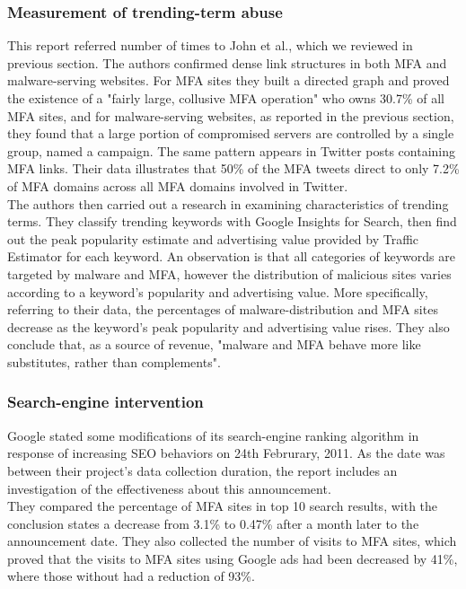 \subsubsection*{Measurement of trending-term abuse}
This report referred number of times to John et al.\cite{deseo}, which we 
reviewed in previous section. The authors confirmed dense link structures in 
both MFA and malware-serving websites. For MFA sites they built a directed 
graph and proved the existence of a "fairly large, collusive MFA operation" 
who owns 30.7\% of all MFA sites, and for malware-serving websites, as 
reported in the previous section, they found that a large portion of 
compromised servers are controlled by a single group, named a campaign. The 
same pattern appears in Twitter posts containing MFA links. Their data 
illustrates that 50\% of the MFA tweets direct to only 7.2\% of MFA domains 
across all MFA domains involved in Twitter. \\
The authors then carried out a research in examining characteristics of 
trending terms. They classify trending keywords with Google Insights for 
Search, then find out the peak popularity estimate and advertising value 
provided by Traffic Estimator for each keyword. An observation is that all 
categories of keywords are targeted by malware and MFA, however the 
distribution of malicious sites varies according to a keyword's popularity and 
advertising value. More specifically, referring to their data, the percentages 
of malware-distribution and MFA sites decrease as the keyword's peak 
popularity and advertising value rises. They also conclude that, as a source 
of revenue, "malware and MFA behave more like substitutes, rather than 
complements".  
\subsubsection*{Search-engine intervention}
Google stated some modifications of its search-engine ranking algorithm in 
response of increasing SEO behaviors on 24th Februrary, 2011. As the date was 
between their project's data collection duration, the report includes an 
investigation of the effectiveness about this announcement. \\
They compared the percentage of MFA sites in top 10 search results, with the 
conclusion states a decrease from 3.1\% to 0.47\% after a month later to the 
announcement date. They also collected the number of visits to MFA sites, 
which proved that the visits to MFA sites using Google ads had been decreased 
by 41\%, where those without had a reduction of 93\%. 

